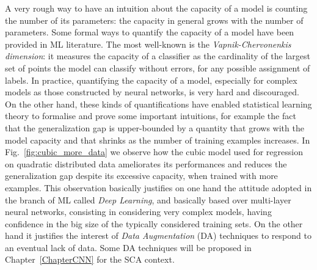 A very rough way to have an intuition about the capacity of a model is counting the number of its parameters: the capacity in general grows with the number of parameters. Some formal ways to quantify the capacity of a model have been provided in ML literature. The most well-known is the \emph{Vapnik-Chervonenkis dimension}: it measures the capacity of a classifier as the cardinality of the largest set of points the model can classify without errors, for any possible assignment of labels. In practice, quantifying the capacity of a model, especially for complex models as those constructed by neural networks, is very hard and discouraged. On the other hand, these kinds of quantifications have enabled statistical learning theory to formalise and prove some important intuitions, for example the fact that the generalization gap is upper-bounded by a quantity that grows with the model capacity and that shrinks as the number of training examples increases. In Fig.~\ref{fig:cubic_more_data} we observe how the cubic model used for regression on quadratic distributed data ameliorates its performances and reduces the generalization gap despite its excessive capacity, when trained with more examples. This observation basically justifies on one hand the attitude adopted in the branch of ML called \emph{Deep Learning}, and basically based over multi-layer neural networks, consisting in considering very complex models, having confidence in the big size of the typically considered training sets. On the other hand it justifies the interest of \emph{Data Augmentation} (DA) techniques \cite{simard2003best} to respond to an eventual lack of data. Some DA techniques will be proposed in Chapter~\ref{ChapterCNN} for the SCA context.

